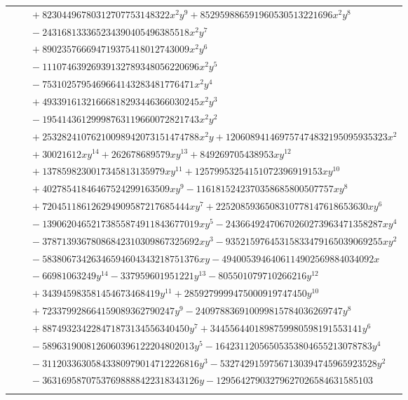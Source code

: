 \documentclass[11pt]{article}
\begin{document}
\begin{longtable}{@{}ll@{}}
 & $\quad +82304496780312707753148322x^{2}y^{9}+852959886591960530513221696x^{2}y^{8}$\\
 & $\quad -243168133365234390405496385518x^{2}y^{7}$\\
 & $\quad +890235766694719375418012743009x^{2}y^{6}$\\
 & $\quad -11107463926939132789348056220696x^{2}y^{5}$\\
 & $\quad -7531025795469664143283481776471x^{2}y^{4}$\\
 & $\quad +49339161321666818293446366030245x^{2}y^{3}$\\
 & $\quad -19541436129998763119660072821743x^{2}y^{2}$\\
 & $\quad +25328241076210098942073151474788x^{2}y+120608941469757474832195095935323x^{2}$\\
 & $\quad +30021612xy^{14}+262678689579xy^{13}+849269705438953xy^{12}$\\
 & $\quad +1378598230017345813135979xy^{11}+12579953254151072396919153xy^{10}$\\
 & $\quad +40278541846467524299163509xy^{9}-1161815242370358685800507757xy^{8}$\\
 & $\quad +720451186126294909587217685444xy^{7}+2252085936508310778147618653630xy^{6}$\\
 & $\quad -13906204652173855874911843677019xy^{5}-24366492470670260273963471358287xy^{4}$\\
 & $\quad -37871393678086842310309867325692xy^{3}-93521597645315833479165039069255xy^{2}$\\
 & $\quad -58380673426346594604343218751376xy-4940053946406114902569884034092x$\\
 & $\quad -66981063249y^{14}-337959601951221y^{13}-805501079710266216y^{12}$\\
 & $\quad +343945983581454673468419y^{11}+2859279999475000919747450y^{10}$\\
 & $\quad +723379928664159089362790247y^{9}-240978836910099815784036269747y^{8}$\\
 & $\quad +887493234228471873134556340450y^{7}+3445564401898759980598191553141y^{6}$\\
 & $\quad -5896319008126060396122204802013y^{5}-16423112056505353804655213078783y^{4}$\\
 & $\quad -31120336305843380979014712226816y^{3}-53274291597567130394745965923528y^{2}$\\
 & $\quad -36316958707537698888422318343126y-12956427903279627026584631585103$\\
\addlinespace[3pt]
\multicolumn{2}{@{}l}{$i=54$, $m=32$, neighbours $6,44,87,118,120$}\\

\end{longtable}
\end{document}
